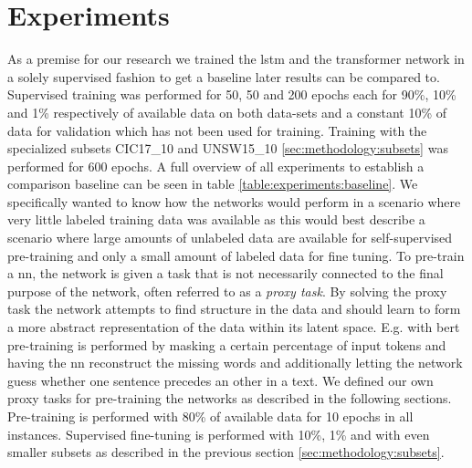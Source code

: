 \chapter{Experiments}\label{sec:experiments}


As a premise for our research we trained the \gls{lstm} and the transformer network in a solely supervised fashion to get a baseline later results can be compared to. Supervised training was performed for 50, 50 and 200 epochs each for 90\%, 10\% and 1\% respectively of available data on both data-sets and a constant 10\% of data for validation which has not been used for training. Training with the specialized subsets CIC17\_10 and UNSW15\_10 \ref{sec:methodology:subsets} was performed for 600 epochs. A full overview of all experiments to establish a comparison baseline can be seen in table \ref{table:experiments:baseline}. We specifically wanted to know how the networks would perform in a scenario where very little labeled training data was available as this would best describe a scenario where large amounts of unlabeled data are available for self-supervised pre-training and only a small amount of labeled data for fine tuning. To pre-train a \gls{nn}, the network is given a task that is not necessarily connected to the final purpose of the network, often referred to as a \textit{proxy task}. By solving the proxy task the network attempts to find structure in the data and should learn to form a more abstract representation of the data within its latent space. E.g. with \gls{bert} pre-training is performed by masking a certain percentage of input tokens and having the \gls{nn} reconstruct the missing words and additionally letting the network guess whether one sentence precedes an other in a text. We defined our own proxy tasks for pre-training the networks as described in the following sections. Pre-training is performed with 80\% of available data for 10 epochs in all instances. Supervised fine-tuning is performed with 10\%, 1\% and with even smaller subsets as described in the previous section \ref{sec:methodology:subsets}. \par
